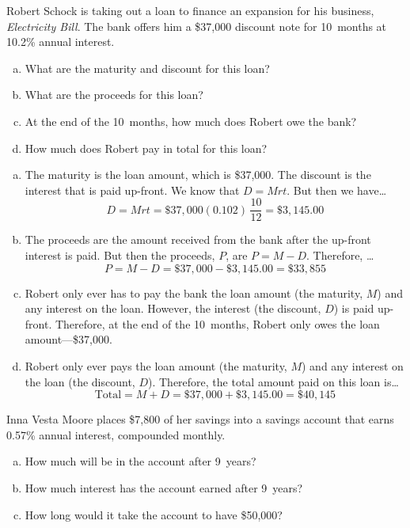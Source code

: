 \documentclass[11pt,letterpaper]{article}
\begin{document}

 Robert Schock is taking out a loan to finance an expansion for his business, \textit{Electricity Bill}. The bank offers him a \$37,000 discount note for 10~months at 10.2\% annual interest. 
	\begin{enumerate}[(a)]
	\item What are the maturity and discount for this loan?
	\item What are the proceeds for this loan?
	\item At the end of the 10~months, how much does Robert owe the bank?
	\item How much does Robert pay in total for this loan?
	\end{enumerate} \pspace

\sol 
\begin{enumerate}[(a)]
\item The maturity is the loan amount, which is \$37,000. The discount is the interest that is paid up-front. We know that $D= Mrt$. But then we have\dots
	\[
	D= Mrt= \$37,\!000 (0.102)\, \frac{10}{12}= \$3,\!145.00
	\] \pspace

\item The proceeds are the amount received from the bank after the up-front interest is paid. But then the proceeds, $P$, are $P= M - D$. Therefore, \dots
	\[
	P= M - D= \$37,\!000 - \$3,\!145.00= \$33,\!855
	\] \pspace

\item Robert only ever has to pay the bank the loan amount (the maturity, $M$) and any interest on the loan. However, the interest (the discount, $D$) is paid up-front. Therefore, at the end of the 10~months, Robert only owes the loan amount---\$37,000. \pspace

\item Robert only ever pays the loan amount (the maturity, $M$) and any interest on the loan (the discount, $D$). Therefore, the total amount paid on this loan is\dots
	\[
	\text{Total}= M + D= \$37,\!000 + \$3,\!145.00= \$40,\!145
	\]
\end{enumerate}



\newpage



 Inna Vesta Moore places \$7,800 of her savings into a savings account that earns 0.57\% annual interest, compounded monthly. 
	\begin{enumerate}[(a)]
	\item How much will be in the account after 9~years?
	\item How much interest has the account earned after 9~years?
	\item How long would it take the account to have \$50,000?
	\end{enumerate} \pspace
\end{document}
